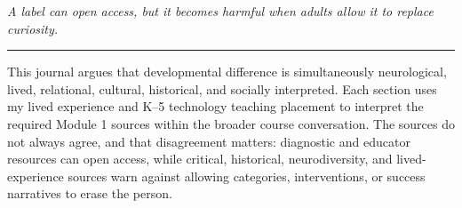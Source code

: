 \documentclass[11pt]{article}
\begin{document}
\begin{titlepage}
\vfill

\begin{center}
\begin{minipage}{0.92\textwidth}
\centering\itshape
A label can open access, but it becomes harmful when adults allow it to replace curiosity.\\
{\color{PrimaryRed}\rule{4in}{0.8pt}}
\end{minipage}
\end{center}

\vfill

\begin{center}
\begin{minipage}{0.95\textwidth}
\small
This journal argues that developmental difference is simultaneously neurological, lived, relational, cultural, historical, and socially interpreted. Each section uses my lived experience and K--5 technology teaching placement to interpret the required Module 1 sources within the broader course conversation. The sources do not always agree, and that disagreement matters: diagnostic and educator resources can open access, while critical, historical, neurodiversity, and lived-experience sources warn against allowing categories, interventions, or success narratives to erase the person.
\end{minipage}
\end{center}

\restoregeometry
\end{titlepage}
\hypersetup{pageanchor=true}






\newpage
\small

\end{document}
